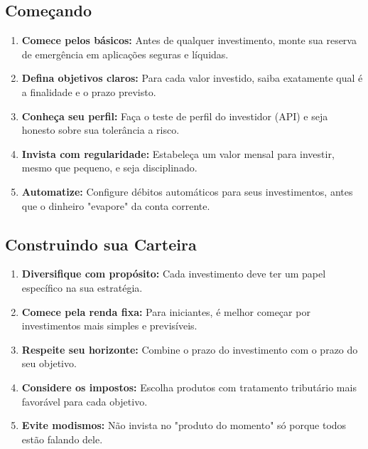 \subsection{Começando}
\begin{enumerate}
    \item \textbf{Comece pelos básicos:} Antes de qualquer investimento, monte sua reserva de emergência em aplicações seguras e líquidas.
    
    \item \textbf{Defina objetivos claros:} Para cada valor investido, saiba exatamente qual é a finalidade e o prazo previsto.
    
    \item \textbf{Conheça seu perfil:} Faça o teste de perfil do investidor (API) e seja honesto sobre sua tolerância a risco.
    
    \item \textbf{Invista com regularidade:} Estabeleça um valor mensal para investir, mesmo que pequeno, e seja disciplinado.
    
    \item \textbf{Automatize:} Configure débitos automáticos para seus investimentos, antes que o dinheiro "evapore" da conta corrente.
\end{enumerate}

\subsection{Construindo sua Carteira}
\begin{enumerate}[resume]
    \item \textbf{Diversifique com propósito:} Cada investimento deve ter um papel específico na sua estratégia.
    
    \item \textbf{Comece pela renda fixa:} Para iniciantes, é melhor começar por investimentos mais simples e previsíveis.
    
    \item \textbf{Respeite seu horizonte:} Combine o prazo do investimento com o prazo do seu objetivo.
    
    \item \textbf{Considere os impostos:} Escolha produtos com tratamento tributário mais favorável para cada objetivo.
    
    \item \textbf{Evite modismos:} Não invista no "produto do momento" só porque todos estão falando dele.
\end{enumerate}

